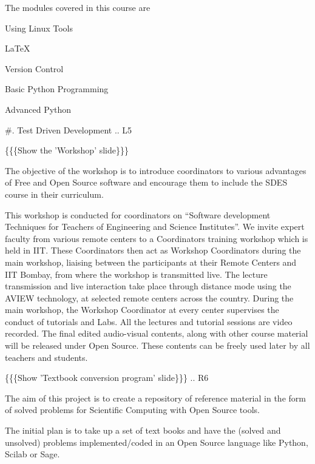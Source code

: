 \documentclass[a4paper,english]{article}
\begin{document}
The modules covered in this course are
\setcounter{listcnt0}{0}
\begin{list}{.}
{
\setlength{\rightmargin}{\leftmargin}
}

\item Using Linux Tools

\item LaTeX

\item Version Control

\item Basic Python Programming

\item Advanced Python
\end{list}

\#. Test Driven Development
.. L5

\{\{\{Show the 'Workshop' slide\}\}\}


The objective of the workshop is to introduce coordinators to various advantages of Free and Open Source software and encourage them to include the SDES course in their curriculum.

This workshop is conducted for coordinators on ``Software development Techniques for Teachers of Engineering and Science Institutes''.  We invite expert faculty from various remote centers to a Coordinators training workshop which is held in IIT. These Coordinators then act as Workshop Coordinators during the main workshop, liaising between the participants at their Remote Centers and IIT Bombay, from where the workshop is transmitted live. The lecture transmission and live interaction take place through distance mode using the AVIEW technology, at selected remote centers across the country. During the main workshop, the Workshop Coordinator at every center supervises the conduct of tutorials and Labs. All the lectures and tutorial sessions are video recorded. The final edited audio-visual contents, along with other course material will be released under Open Source. These contents can be freely used later by all teachers and students.


\{\{\{Show 'Textbook conversion program' slide\}\}\}
.. R6

The aim of this project is to create a repository of reference material in the form of solved problems for Scientific Computing with Open Source tools.

The initial plan is to take up a set of text books and have the (solved and unsolved) problems implemented/coded in an Open Source language like Python, Scilab or Sage.
\end{document}
